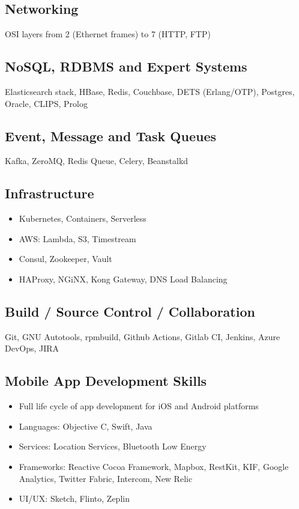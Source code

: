 \subsection*{Networking}
OSI layers from 2 (Ethernet frames) to 7 (HTTP, FTP)

\subsection*{NoSQL, RDBMS and Expert Systems}
Elasticsearch stack, HBase, Redis, Couchbase, DETS (Erlang/OTP), Postgres, Oracle, CLIPS, Prolog

\subsection*{Event, Message and Task Queues}
Kafka, ZeroMQ, Redis Queue, Celery, Beanstalkd

\subsection*{Infrastructure}
\begin{itemize}[noitemsep, nosep]
  \item Kubernetes, Containers, Serverless
  \item AWS: Lambda, S3, Timestream
  \item Consul, Zookeeper, Vault
  \item HAProxy, NGiNX, Kong Gateway, DNS Load Balancing
\end{itemize}

\subsection*{Build / Source Control / Collaboration}
Git, GNU Autotools, rpmbuild, Github Actions, Gitlab CI, Jenkins, Azure DevOps, JIRA

\subsection*{Mobile App Development Skills}
\begin{itemize}[noitemsep, nosep]
  \item Full life cycle of app development for iOS and Android platforms
  \item Languages: Objective C, Swift, Java
  \item Services: Location Services, Bluetooth Low Energy
  \item Frameworks: Reactive Cocoa Framework, Mapbox, RestKit, KIF, Google Analytics, Twitter Fabric, Intercom, New Relic
  \item UI/UX: Sketch, Flinto, Zeplin
\end{itemize}

